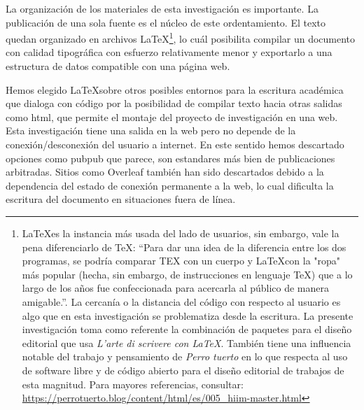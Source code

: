 


La organización de los materiales de esta investigación es importante. La publicación de una sola fuente es el núcleo de este ordentamiento. El texto quedan organizado en archivos \LaTeX\footnote{\LaTeX es la instancia más usada del lado de usuarios, sin embargo, vale la pena diferenciarlo de \TeX: ``Para dar una idea de la diferencia entre los dos programas, se podría comparar TEX con un cuerpo y \LaTeX con la "ropa" más popular (hecha, sin embargo, de instrucciones en lenguaje \TeX) que a lo largo de los años fue confeccionada para acercarla al público de manera amigable.''\citep[p.~14]{pantieri2008arte}. La cercanía o la distancia del código con respecto al usuario es algo que en esta investigación se problematiza desde la escritura. La presente investigación toma como referente la combinación de paquetes para el diseño editorial que usa \emph{L’arte di scrivere con \LaTeX}. También tiene una influencia notable del trabajo y pensamiento de \emph{Perro tuerto} en lo que respecta al uso de software libre y de código abierto para el diseño editorial de trabajos de esta magnitud. Para mayores referencias, consultar: \url{https://perrotuerto.blog/content/html/es/005_hiim-master.html}}, lo cuál posibilita compilar un documento con calidad tipográfica con esfuerzo relativamente menor \citep{texBook} y exportarlo a una estructura de datos compatible con una página web. %

Hemos elegido \LaTeX sobre otros posibles entornos para la escritura académica que dialoga con código por la posibilidad de compilar texto hacia otras salidas como \Gls{html}, que permite el montaje del proyecto de investigación en una web. Esta investigación tiene una salida en la web pero no depende de la conexión/desconexión del usuario a internet. En este sentido hemos descartado opciones como pubpub que parece, son estandares más bien de publicaciones arbitradas. Sitios como Overleaf también han sido descartados debido a la dependencia del estado de conexión permanente a la web, lo cual dificulta la escritura del documento en situaciones fuera de línea. 

